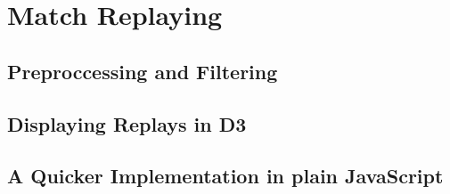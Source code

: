 \section{Match Replaying}

\subsection{Preproccessing and Filtering}

\subsection{Displaying Replays in D3}

\subsection{A Quicker Implementation in plain JavaScript}